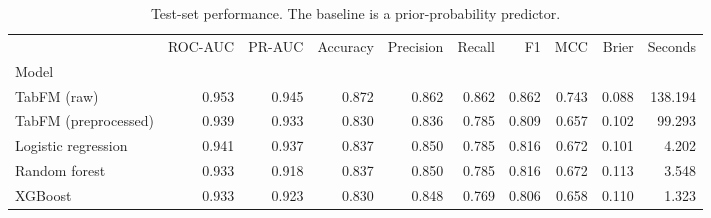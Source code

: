 \begin{table}
\caption{Test-set performance. The baseline is a prior-probability predictor.}
\label{tab:results}
\begin{tabular}{lrrrrrrrrr}
\toprule
 & ROC-AUC & PR-AUC & Accuracy & Precision & Recall & F1 & MCC & Brier & Seconds \\
Model &  &  &  &  &  &  &  &  &  \\
\midrule
TabFM (raw) & 0.953 & 0.945 & 0.872 & 0.862 & 0.862 & 0.862 & 0.743 & 0.088 & 138.194 \\
TabFM (preprocessed) & 0.939 & 0.933 & 0.830 & 0.836 & 0.785 & 0.809 & 0.657 & 0.102 & 99.293 \\
Logistic regression & 0.941 & 0.937 & 0.837 & 0.850 & 0.785 & 0.816 & 0.672 & 0.101 & 4.202 \\
Random forest & 0.933 & 0.918 & 0.837 & 0.850 & 0.785 & 0.816 & 0.672 & 0.113 & 3.548 \\
XGBoost & 0.933 & 0.923 & 0.830 & 0.848 & 0.769 & 0.806 & 0.658 & 0.110 & 1.323 \\
\bottomrule
\end{tabular}
\end{table}
